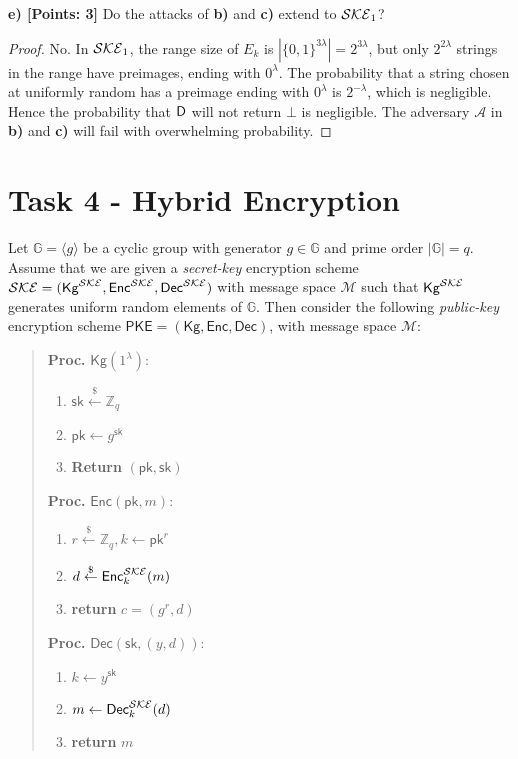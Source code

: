 \documentclass[12pt]{article}
\newcommand{\Z}{\mathbb{Z}}
\newcommand{\bits}{\{0,1\}}
\newcommand{\getsr}{\stackrel{\$}{\gets}}
\newcommand{\angles}[1]{\langle #1 \rangle}
\newcommand{\M}{\mathcal{M}}
\theoremstyle{definition}
\newcommand{\PKE}{\textsf{PKE}}
\newcommand{\Kg}{\textsf{Kg}}
\newcommand{\Enc}{\textsf{Enc}}
\newcommand{\Dec}{\textsf{Dec}}
\newcommand{\pk}{\textsf{pk}}
\newcommand{\sk}{\textsf{sk}}
\newcommand{\A}{\mathcal{A}}
\begin{document}
{\bf e) [Points: 3]} Do the attacks of {\bf b)} and {\bf c)} extend to $\mathcal{SKE}_1$?
\begin{proof}
No. In $\mathcal{SKE}_1$, the range size of $E_k$ is $|\bits^{3\lambda}| = 2^{3\lambda}$, but only $2^{2\lambda}$ strings in the range have preimages, ending with $0^\lambda$. The probability that a string chosen at uniformly random has a preimage ending with $0^\lambda$ is $2^{-\lambda}$, which is negligible. Hence the probability that $\mathsf{D}$ will not return $\bot$ is negligible. The adversary $\A$ in {\bf b)} and {\bf c)} will fail with overwhelming probability.
\end{proof}

\newcommand{\G}{\mathbb{G}}
\section{Task 4 - Hybrid Encryption}
Let $\G = \angles{g}$ be a cyclic group with generator $g \in \G$ and prime order $|\G|=q$.
Assume that we are given a \emph{secret-key} encryption scheme $\SKE = (\Kg^\SKE,\Enc^\SKE,\Dec^\SKE)$ with message space $\M$ such that $\Kg^\SKE$ generates uniform random elements of $\G$. Then consider the following \emph{public-key} encryption scheme $\PKE = (\Kg,\Enc,\Dec)$, with message space $\M$:
\begin{quote}
\begin{minipage}[t]{0.25\textwidth}
{\bf Proc.} $\Kg(1^\lambda)$:
\begin{enumerate}
\item $\sk \getsr \Z_q$
\item $\pk \gets g^\sk$
\item {\bf Return} $(\pk,\sk)$
\end{enumerate}
\end{minipage}
\begin{minipage}[t]{0.3\textwidth}
{\bf Proc.} $\Enc(\pk, m)$:
\begin{enumerate}
\item $r \getsr \Z_q, k \gets \pk^r$
\item $d \getsr \Enc_k^\SKE(m)$
\item {\bf return} $c=(g^r,d)$
\end{enumerate}
\end{minipage}
\begin{minipage}[t]{0.3\textwidth}
{\bf Proc.} $\Dec(\sk, (y,d))$:
\begin{enumerate}
\item $k \gets y^\sk$
\item $m \gets \Dec_k^\SKE(d)$
\item {\bf return} $m$
\end{enumerate}
\end{minipage}
\end{quote}
\end{document}
